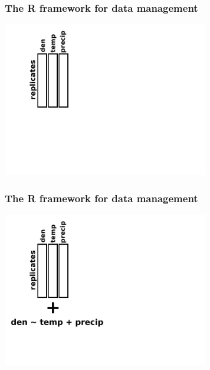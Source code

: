 \documentclass{beamer}
\numberwithin{exercise}{section}
\begin{document}
%

\begin{frame}
\frametitle{The R framework for data management}
\begin{center}
\vspace{-1cm}
\includegraphics[width=9cm]{dataframe2function1}
\end{center}
\end{frame}

\begin{frame}
\frametitle{The R framework for data management}
\begin{center}
\vspace{-1cm}
\includegraphics[width=9cm]{dataframe2function2}
\end{center}
\end{frame}
\end{document}
